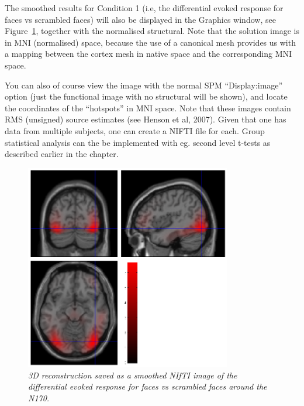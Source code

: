 The smoothed results for Condition 1 (i.e, the differential evoked response for faces vs scrambled faces) will also be displayed in the Graphics window, see Figure~\ref{multimodal:fig:eegrecon}, together with the normalised structural. Note that the solution image is in MNI (normalised) space, because the use of a canonical mesh provides us with a mapping between the cortex mesh in native space and the corresponding MNI space.

You can also of course view the image with the normal SPM ``Display:image'' option (just the functional image with no structural will be shown), and locate the coordinates of the ``hotspots'' in MNI space. Note that these images contain RMS (unsigned) source estimates (see Henson et al, 2007).
Given that one has data from multiple subjects, one can create a NIFTI file for each. Group statistical analysis can the be implemented with eg. second level t-tests as described earlier in the chapter.


\begin{figure}[h!t]
\begin{center}
\includegraphics[width=90mm]{multimodal/figures/eeg_recon.png}
\caption{\em 3D reconstruction saved as a smoothed NIfTI image of the differential evoked response for faces vs scrambled faces around the N170. \label{multimodal:fig:eegrecon}}
\end{center}
\end{figure}
